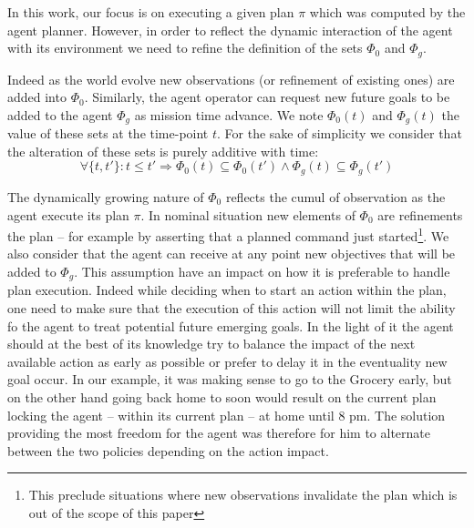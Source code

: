 In this work, our focus is on executing a given plan $\pi$ which was
computed by the agent planner. However, in order to reflect the
dynamic interaction of the agent with its environment we need to
refine the definition of the sets $\Phi_0$ and $\Phi_g$. 

Indeed as the world evolve new observations (or refinement of
existing ones) are added into $\Phi_0$. Similarly, the agent operator
can request new future goals to be added to the agent $\Phi_g$ as
mission time advance. We note $\Phi_0(t)$ and $\Phi_g(t)$ the value 
of these sets at the time-point $t$. For the sake of simplicity we
 consider that the alteration of these sets is purely additive with
 time:
\[ \forall \{t, t'\}: t \le t' \Rightarrow \Phi_0(t) \subseteq \Phi_0(t')
\wedge \Phi_g(t) \subseteq \Phi_g(t') \] 

The dynamically growing nature of $\Phi_0$ reflects the cumul of
observation as the agent execute its plan $\pi$. In nominal 
situation new elements of $\Phi_0$ are refinements the plan 
-- for example by asserting that a planned command just
started\footnote{This preclude situations where new observations
  invalidate the plan which is out of the scope of this paper}. We
also consider that the agent can receive at any point new objectives
that will be added to $\Phi_g$. This assumption have an impact on how
it is preferable to handle plan execution. Indeed while deciding
when to start an action within the plan, one need to make  sure that
the execution of this action will not limit the ability fo the agent
to treat potential future emerging goals. In the light of it the agent
should at the best of its knowledge  try to balance the impact of the
next available action as early as possible or prefer to delay it in
the eventuality new goal occur. In our example, it was making sense to
go to the Grocery early, but on the other hand going back home to soon
would result on the current plan locking the agent -- within its current
plan -- at home until 8 pm. The solution providing the most freedom for
the agent was therefore for him to alternate between the two policies
depending on the action impact. 

